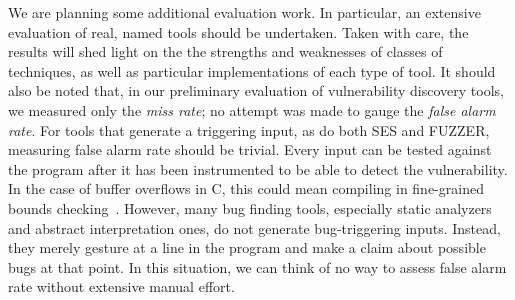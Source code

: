 We are planning some additional evaluation work.
In particular, an extensive evaluation of real, named tools should be undertaken.
Taken with care, the results will shed light on the the strengths and weaknesses of classes of techniques, as well as particular implementations of each type of tool.
It should also be noted that, in our preliminary evaluation of vulnerability discovery tools, we measured only the \emph{miss rate}; no attempt was made to gauge the \emph{false alarm rate}.
For tools that generate a triggering input, as do both SES and FUZZER, measuring false alarm rate should be trivial. 
Every input can be tested against the program after it has been instrumented to be able to detect the vulnerability.
In the case of buffer overflows in C, this could mean compiling in fine-grained bounds checking~\cite{ruwase2004practical}.
However, many bug finding tools, especially static analyzers and abstract interpretation ones, do not generate bug-triggering inputs.
Instead, they merely gesture at a line in the program and make a claim about possible bugs at that point.
In this situation, we can think of no way to assess false alarm rate without extensive manual effort.

